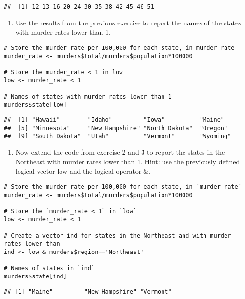 \documentclass[
]{article}
\providecommand{\tightlist}{%
  \setlength{\itemsep}{0pt}\setlength{\parskip}{0pt}}
\begin{document}
\begin{verbatim}
##  [1] 12 13 16 20 24 30 35 38 42 45 46 51
\end{verbatim}

\begin{enumerate}
\def\labelenumi{\arabic{enumi}.}
\setcounter{enumi}{2}
\tightlist
\item
  Use the results from the previous exercise to report the names of the
  states with murder rates lower than 1.
\end{enumerate}

\begin{verbatim}
# Store the murder rate per 100,000 for each state, in murder_rate
murder_rate <- murders$total/murders$population*100000

# Store the murder_rate < 1 in low 
low <- murder_rate < 1

# Names of states with murder rates lower than 1
murders$state[low]
\end{verbatim}

\begin{verbatim}
##  [1] "Hawaii"        "Idaho"         "Iowa"          "Maine"        
##  [5] "Minnesota"     "New Hampshire" "North Dakota"  "Oregon"       
##  [9] "South Dakota"  "Utah"          "Vermont"       "Wyoming"
\end{verbatim}

\begin{enumerate}
\def\labelenumi{\arabic{enumi}.}
\setcounter{enumi}{3}
\tightlist
\item
  Now extend the code from exercise 2 and 3 to report the states in the
  Northeast with murder rates lower than 1. Hint: use the previously
  defined logical vector low and the logical operator \&.
\end{enumerate}

\begin{verbatim}
# Store the murder rate per 100,000 for each state, in `murder_rate`
murder_rate <- murders$total/murders$population*100000

# Store the `murder_rate < 1` in `low` 
low <- murder_rate < 1

# Create a vector ind for states in the Northeast and with murder rates lower than
ind <- low & murders$region=='Northeast'

# Names of states in `ind` 
murders$state[ind] 
\end{verbatim}

\begin{verbatim}
## [1] "Maine"         "New Hampshire" "Vermont"
\end{verbatim}
\end{document}

